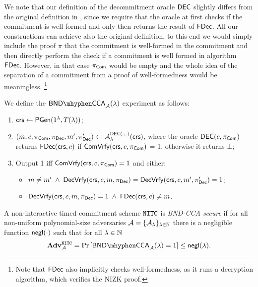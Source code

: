\begin{remark} We note that our definition of the decommitment oracle $\mathsf{DEC}$ slightly differs from the original definition in \cite{TCC:KatLosXu20}, since we require that the oracle at first checks if the commitment is well formed and only then returns the result of $\mathsf{FDec}$. All our constructions can achieve also the original definition, to this end we would simply include the proof $\pi$ that the commitment is well-formed in the commitment and then directly perform the check if a commitment is well formed in algorithm $\mathsf{FDec}$. However, in that case $\pi_{\mathsf{Com}}$ would be empty and the whole idea of the separation of a commitment from a proof of well-formedness would be meaningless.
\footnote{Note that \cite{TCC:KatLosXu20} $\mathsf{FDec}$ also implicitly checks well-formedness, as it runs a decryption algorithm, which verifies the NIZK proof.}
\end{remark}


\begin{definition}
\label{def:nitc-bnd}
We define the $\mathsf{BND \mhyphen CCA}_\adv(\secpar)$ experiment as follows:
\begin{enumerate}
\item $\mathsf{crs} \leftarrow \mathsf{PGen}(1{^{\lambda}}, T(\lambda))$;
\item $(m, c, \pi_{\mathsf{Com}}, \pi_{\mathsf{Dec}}, m', \pi_{\mathsf{Dec}}') \leftarrow \mathcal{A}_{\lambda}^{\mathsf{DEC}(\cdot,\cdot)}(\mathsf{crs})$, where the oracle $\mathsf{DEC}(c, \pi_{\mathsf{Com}})$ returns $\mathsf{FDec}(\mathsf{crs}, c)$ if $\mathsf{ComVrfy}(\mathsf{crs},c,\pi_{\mathsf{Com}})$ = 1, otherwise it returns $\bot$;
\item Output 1 iff $\mathsf{ComVrfy}(\mathsf{crs}, c, \pi_{\mathsf{Com}})= 1$ and either:
\begin{itemize}
\item $m \neq m' \; \land \; \mathsf{DecVrfy}(\mathsf{crs}, c, m, \pi_{\mathsf{Dec}}) = \mathsf{DecVrfy}(\mathsf{crs}, c, m', \pi_{\mathsf{Dec}}') = 1$;
\item $\mathsf{DecVrfy}(\mathsf{crs}, c, m, \pi_{\mathsf{Dec}}) = 1 \; \land \; \mathsf{FDec}(\mathsf{crs}, c) \neq m$.
\end{itemize}
\end{enumerate}
A non-interactive timed commitment scheme $\mathtt{NITC}$ is \emph{BND-CCA secure} if for all non-uniform polynomial-size adversaries $\mathcal{A} = \{\mathcal{A}_{\lambda}\}_{\lambda \in \mathbb{N}}$ there is a negligible function $\mathsf{negl}(\cdot)$ such that for all $\lambda \in \mathbb{N}$ 
\[ \advtg^{\nitc}_{\adv} = 
\Pr\left[ \mathsf{BND \mhyphen CCA}_\adv(\secpar) = 1 \right] \leq \negl(\secpar). 
\]
\end{definition}

